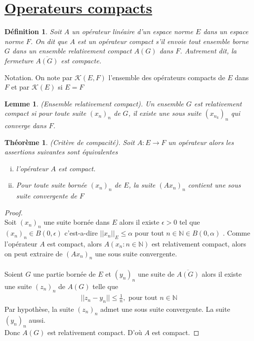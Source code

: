 \documentclass{report}
\newtheorem{Def}{Définition}[subsection]
\newtheorem{The}{Théorème}[subsection]
\newtheorem{Lem}{Lemme}[subsection]
\begin{document}
{\section{\underline{Operateurs compacts}}

\begin{Def} Soit $A$ un opérateur linéaire d'un espace norme $E$ dans un espace norme $F$. On dit que $A$ est un opérateur compact s'il envoie tout ensemble borne $G$ dans un ensemble relativement compact $A(G)$ dans $F$. Autrement dit, la fermeture $\overline{A(G)}$ est compacte.\\
\end{Def}

Notation. On note par $\mathscr{K}(E,F)$ l'ensemble des opérateurs compacts de $E$ dans $F$ et par $\mathscr{K}(E)$ si $E = F$ \\

\begin{Lem} (Ensemble relativement compact). Un ensemble $G$ est relativement compact si pour toute suite $(x_n)_n$ de $G$, il existe une sous suite $(x_{n_k})_n$ qui converge dans $F$.\\
\end{Lem}

\begin{The} (Critère de compacité). Soit $A: E \rightarrow F$ un opérateur alors les assertions suivantes sont équivalentes 
	\begin{enumerate}[i)]
	\item l'opérateur $A$ est compact.\\
	\item Pour toute suite bornée $(x_n)_n$ de $E$, la suite $(A x_n)_n$ contient une sous suite convergente de $F$ 
	\end{enumerate}
\end{The}
\begin{proof}
  \\
 Soit $(x_n)_n$ une suite bornée dans $E$ alors il existe $\epsilon > 0$ tel que $(x_n)_n \in B(0,\epsilon)$ c'est-a-dire $||x_n||_E \le \alpha$ pour tout $n \in \mathbb{N} \in B(0, \alpha)$ . Comme l'opérateur $A$ est compact, alors $A({x_n : n\in \mathbb{N}})$ est relativement compact, alors on peut extraire de $(A x_n)_n$ une sous suite convergente.\\
  \\
 Soient $G$ une partie bornée de $E$ et $(y_n)_n$ une suite de $\overline{A(G)}$ alors il existe une suite $(z_n)_n$ de $A(G)$ telle que 
 						 			\begin{align*}
 						 ||z_n - y_n|| \le \frac{1}{n} ,   \,\,\text{pour tout}\,\, n \in \mathbb{N}
									\end{align*}
 Par hypothèse, la suite $(z_n)_n$ admet une sous suite convergente. La suite $(y_n)_n$ aussi. \\
 Donc $A(G)$ est relativement compact. D'où $A$ est compact. 
\end{proof}





}
\end{document}
